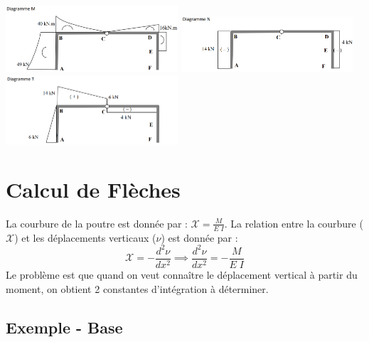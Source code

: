 \documentclass[a4paper]{article}
\begin{document}
\begin{center}
\includegraphics[width=0.48\textwidth]{images/MNT03.PNG}
\includegraphics[width=0.48\textwidth]{images/MNT04.PNG}
\includegraphics[width=0.48\textwidth]{images/MNT05.PNG}
\end{center}









\section{Calcul de Flèches}





La courbure de la poutre est donnée par : $\displaystyle \mathcal{X} = \frac{M}{E \; I} $. La relation entre la courbure ($ \mathcal{X} $) et les déplacements verticaux ($ \nu $) est donnée par : 
\[ \mathcal{X} = - \frac{d^2 \nu}{d x^2} \implies \frac{d^2 \nu}{d x^2} = - \frac{M}{E \; I} \]
Le problème est que quand on veut connaître le déplacement vertical à partir du moment, on obtient 2 constantes d'intégration à déterminer.





\subsection{Exemple - Base}
\end{document}
